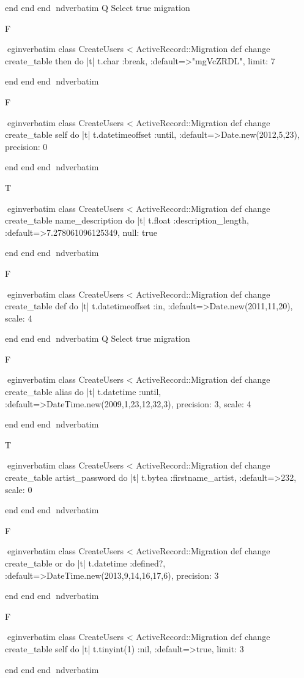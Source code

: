     end 
  end 
end
nd{verbatim}
Q
 Select true migration

F

egin{verbatim}
 class CreateUsers < ActiveRecord::Migration 
  def change 
    create_table then do |t| 
      t.char :break, :default=>"mgVcZRDL", limit: 7
    
    end 
  end 
end
nd{verbatim}

F

egin{verbatim}
 class CreateUsers < ActiveRecord::Migration 
  def change 
    create_table self do |t| 
      t.datetimeoffset :until, :default=>Date.new(2012,5,23), precision: 0
    
    end 
  end 
end
nd{verbatim}

T

egin{verbatim}
 class CreateUsers < ActiveRecord::Migration 
  def change 
    create_table name_description do |t| 
      t.float :description_length, :default=>7.278061096125349, null: true
    
    end 
  end 
end
nd{verbatim}

F

egin{verbatim}
 class CreateUsers < ActiveRecord::Migration 
  def change 
    create_table def do |t| 
      t.datetimeoffset :in, :default=>Date.new(2011,11,20), scale: 4
    
    end 
  end 
end
nd{verbatim}
Q
 Select true migration

F

egin{verbatim}
 class CreateUsers < ActiveRecord::Migration 
  def change 
    create_table alias do |t| 
      t.datetime :until, :default=>DateTime.new(2009,1,23,12,32,3), precision: 3, scale: 4
    
    end 
  end 
end
nd{verbatim}

T

egin{verbatim}
 class CreateUsers < ActiveRecord::Migration 
  def change 
    create_table artist_password do |t| 
      t.bytea :firstname_artist, :default=>232, scale: 0
    
    end 
  end 
end
nd{verbatim}

F

egin{verbatim}
 class CreateUsers < ActiveRecord::Migration 
  def change 
    create_table or do |t| 
      t.datetime :defined?, :default=>DateTime.new(2013,9,14,16,17,6), precision: 3
    
    end 
  end 
end
nd{verbatim}

F

egin{verbatim}
 class CreateUsers < ActiveRecord::Migration 
  def change 
    create_table self do |t| 
      t.tinyint(1) :nil, :default=>true, limit: 3
    
    end 
  end 
end
nd{verbatim}
